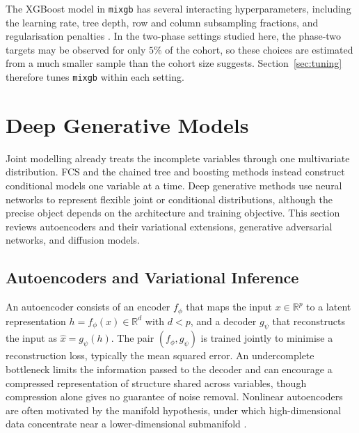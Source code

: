 The XGBoost model in \texttt{mixgb} has several interacting hyperparameters, including the learning rate, tree depth, row and column subsampling fractions, and regularisation penalties \citep{chen2016xgboost}. In the two-phase settings studied here, the phase-two targets may be observed for only $5\%$ of the cohort, so these choices are estimated from a much smaller sample than the cohort size suggests. Section~\ref{sec:tuning} therefore tunes \texttt{mixgb} within each setting.


\section{Deep Generative Models}
\label{sec:deep_gen}

Joint modelling already treats the incomplete variables through one multivariate distribution. FCS and the chained tree and boosting methods instead construct conditional models one variable at a time. Deep generative methods use neural networks to represent flexible joint or conditional distributions, although the precise object depends on the architecture and training objective. This section reviews autoencoders and their variational extensions, generative adversarial networks, and diffusion models.


\subsection{Autoencoders and Variational Inference}
\label{sec:ae_vae}

An autoencoder consists of an encoder $f_{\phi}$ that maps the input $x \in \mathbb{R}^p$ to a latent representation $h = f_{\phi}(x) \in \mathbb{R}^d$ with $d < p$, and a decoder $g_{\psi}$ that reconstructs the input as $\hat{x} = g_{\psi}(h)$. The pair $(f_{\phi}, g_{\psi})$ is trained jointly to minimise a reconstruction loss, typically the mean squared error. An undercomplete bottleneck limits the information passed to the decoder and can encourage a compressed representation of structure shared across variables, though compression alone gives no guarantee of noise removal. Nonlinear autoencoders are often motivated by the manifold hypothesis, under which high-dimensional data concentrate near a lower-dimensional submanifold \citep{bengio2013representation, goodfellow2016deep}.

